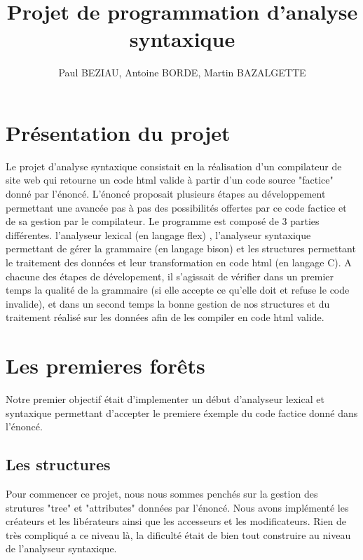 \documentclass[12pt]{article}
\begin{document}
\title{Projet de programmation d'analyse syntaxique}
\author{Paul BEZIAU, Antoine BORDE, Martin BAZALGETTE}

\maketitle
\newpage
\tableofcontents
\newpage


\section{Présentation du projet}
Le projet d'analyse syntaxique consistait en la réalisation d'un compilateur
de site web qui retourne un code html valide à partir d'un code source "factice"
donné par l'énoncé.
\newline
L'énoncé proposait plusieurs étapes au développement permettant une avancée
pas à pas des possibilités offertes par ce code factice et de sa gestion
par le compilateur.
\newline
Le programme est composé de 3 parties différentes. l'analyseur lexical (en langage flex) ,
l'analyseur syntaxique permettant de gérer la grammaire (en langage bison) et les structures
permettant le traitement des données et leur transformation en code html (en langage C).
\newline
A chacune des étapes de dévelopement, il s'agissait de vérifier dans un premier
temps la qualité de la grammaire (si elle accepte ce qu'elle doit et refuse
le code invalide), et dans un second temps la bonne gestion de nos structures
et du traitement réalisé sur les données afin de les compiler en code html valide.

\newpage

\section{Les premieres forêts}

Notre premier objectif était d'implementer un début d'analyseur lexical et syntaxique
permettant d'accepter le premiere éxemple du code factice donné dans l'énoncé.

\subsection{Les structures}

Pour commencer ce projet, nous nous sommes penchés sur la gestion des strutures
"tree" et "attributes" données par l'énoncé. Nous avons implémenté les créateurs et les
libérateurs ainsi que les accesseurs et les modificateurs. Rien de très compliqué a ce niveau
là, la dificulté était de bien tout construire au niveau de l'analyseur syntaxique.
\end{document}
